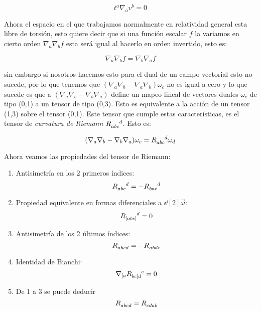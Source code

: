 \documentclass[../Main.tex]{subfiles}
\begin{document}
\begin{equation}
    t^{a}\nabla_{a}v^{b} = 0 
\end{equation}

Ahora el espacio en el que trabajamos normalmente en relatividad general esta libre de torsión, esto quiere decir que si una función escalar $f$ la variamos en cierto orden $\nabla_{a}\nabla_{b}f$ esta será igual al hacerlo en orden invertido, esto es:

\begin{equation}
    \nabla_{a}\nabla_{b}f = \nabla_{b}\nabla_{a}f
\end{equation}

sin embargo si nosotros hacemos esto para el dual de un campo vectorial esto no sucede, por lo que tenemos que $(\nabla_{a}\nabla_{b}-\nabla_{a}\nabla_{b})\omega_{c}$ no es igual a cero y lo que sucede es que a $(\nabla_{a}\nabla_{b}-\nabla_{b}\nabla_{a})$ define un mapeo lineal de vectores duales $\omega_{c}$ de tipo (0,1) a un tensor de tipo (0,3). Esto es equivalente a la acción de un tensor (1,3) sobre el tensor (0,1). Este tensor que cumple estas características, es el tensor de \textit{curvatura de Riemann} $\tensor{R}{_{abc}^{d}}$. Esto es:

\begin{equation}
    (\nabla_{a}\nabla_{b}-\nabla_{b}\nabla_{a})\omega_{c} = \tensor{R}{_{abc}^{d}}\omega_{d}
\end{equation}

Ahora veamos las propiedades del tensor de Riemann:

\begin{enumerate}
    \item Antisimetría en los 2 primeros índices:
    \begin{equation}
        \tensor{R}{_{abc}^{d}} = -\tensor{R}{_{bac}^{d}}
        \label{Riemann:1}
    \end{equation}

    \item Propiedad equivalente en formas diferenciales a $\dd[2]{\vec{\omega}}$:
    \begin{equation}
        \tensor{R}{_{[abc]}^{d}} = 0
        \label{Riemann:2}
    \end{equation}

    \item Antisimetría de los 2 últimos índices:
    \begin{equation}
        \tensor{R}{_{abcd}} = -\tensor{R}{_{abdc}}
        \label{Riemann:3}
    \end{equation}

    \item Identidad de Bianchi:
    \begin{equation}
        \nabla_{[a}\tensor{R}{_{bc]d}^e} = 0
        \label{Riemann:4}
    \end{equation}

    \item De 1 a 3 se puede deducir
    \begin{equation}
        \tensor{R}{_{abcd}} = \tensor{R}{_{cdab}}
        \label{Riemann:5}
    \end{equation}
\end{enumerate}
\end{document}
